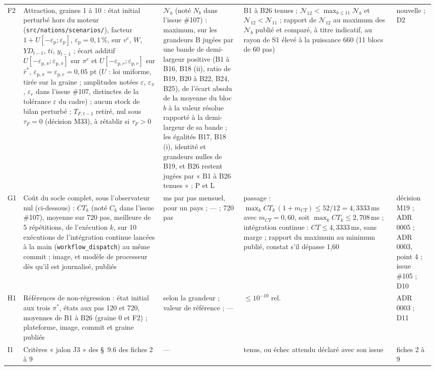\documentclass[11pt,a4paper]{article}
\begin{document}
\begin{center}
\begin{longtable}{p{0.7cm}>{\raggedright\arraybackslash}p{4.4cm}>{\raggedright\arraybackslash}p{2.8cm}>{\raggedright\arraybackslash}p{3.6cm}>{\raggedright\arraybackslash}p{2.3cm}}
F2 & Attraction, graines 1 à 10 : état initial perturbé hors du moteur (\nolinkurl{src/nations/scenarios/}), facteur $1 + U[-\varepsilon_{\mathrm{p}} ; \varepsilon_{\mathrm{p}}]$, $\varepsilon_{\mathrm{p}} = 0{,}1\,\%$, sur $v^e$, $W$, $\mathit{YD}_{t-1}$, $\mathit{ti}$, $y_{t-1}$ ; écart additif $U[-\varepsilon_{\mathrm{p},\pi} ; \varepsilon_{\mathrm{p},\pi}]$ sur $\pi^e$ et $U[-\varepsilon_{\mathrm{p},r} ; \varepsilon_{\mathrm{p},r}]$ sur $\hat r^\ast$, $\varepsilon_{\mathrm{p},\pi} = \varepsilon_{\mathrm{p},r} = 0{,}05$ pt ($U$ : loi uniforme, tirée sur la graine ; amplitudes notées $\varepsilon$, $\varepsilon_\pi$, $\varepsilon_r$ dans l'issue \#107, distinctes de la tolérance $\varepsilon$ du cadre) ; aucun stock de bilan perturbé ; $T_{F,t-1}$ retiré, nul sous $\tau_F = 0$ (décision M33), à rétablir si $\tau_F > 0$ & $\mathcal{N}_b$ (noté $N_b$ dans l'issue \#107) : maximum, sur les grandeurs B jugées par une bande de demi-largeur positive (B1 à B16, B18 (ii), ratio de B19, B20 à B22, B24, B25), de l'écart absolu de la moyenne du bloc $b$ à la valeur résolue rapporté à la demi-largeur de sa bande ; les égalités B17, B18 (i), identité et grandeurs nulles de B19, et B26 restent jugées par « B1 à B26 tenues » ; P et L & B1 à B26 tenues ; $\mathcal{N}_{12} < \max_{b \le 11} \mathcal{N}_b$ et $\mathcal{N}_{12} < \mathcal{N}_{11}$ ; rapport de $\mathcal{N}_{12}$ au maximum des $\mathcal{N}_b$ publié et comparé, à titre indicatif, au rayon de S1 élevé à la puissance 660 (11 blocs de 60 pas) & nouvelle ; D2\\
G1 & Coût du socle complet, sous l'observateur nul (ci-dessous) : $\mathit{CT}_k$ (noté $C_k$ dans l'issue \#107), moyenne sur 720 pas, meilleure de 5 répétitions, de l'exécution $k$, sur 10 exécutions de l'intégration continue lancées à la main (\texttt{workflow\_dispatch}) au même commit ; image, et modèle de processeur dès qu'il est journalisé, publiés & ms par pas mensuel, pour un pays ; --- ; 720 pas & passage : $\max_k \mathit{CT}_k\,(1 + m_{\mathit{CT}}) \le 52/12 = 4{,}3333$\,ms avec $m_{\mathit{CT}} = 0{,}60$, soit $\max_k \mathit{CT}_k \le 2{,}708$\,ms ; intégration continue : $\mathit{CT} \le 4{,}3333$\,ms, sans marge ; rapport du maximum au minimum publié, constat s'il dépasse 1,60 & décision M19 ; ADR 0005 ; ADR 0003, point 4 ; issue \#105 ; D10\\
H1 & Références de non-régression : état initial aux trois $\pi^\ast$, états aux pas 120 et 720, moyennes de B1 à B26 (graine 0 et F2) ; plateforme, image, commit et graine publiés & selon la grandeur ; valeur de référence ; --- & $\le 10^{-10}$ rel. & ADR 0003 ; D11\\
I1 & Critères « jalon J3 » des \S~9.6 des fiches 2 à 9 & --- & tenus, ou échec attendu déclaré avec son issue & fiches 2 à 9\\
\bottomrule
\end{longtable}
\end{center}
\end{document}
